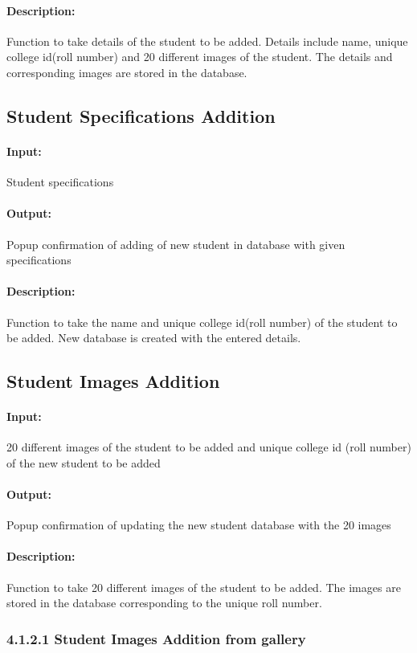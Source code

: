 \paragraph{Description:}
Function to take details of the student to be added. Details include name, 
unique college id(roll number) and 20 different images of the student. The
details and corresponding images are stored in the database.


\subsection{Student Specifications Addition}
\paragraph{Input:}
Student specifications
\paragraph{Output:}
Popup confirmation of adding of new student in database with given specifications
\paragraph{Description:}
Function to take the name and unique college id(roll number) of the student
to be added. New database is created with the entered details.

\subsection{Student Images Addition}
\paragraph{Input:}
20 different images of the student to be added and unique college id
(roll number) of the new student to be added
\paragraph{Output:}
Popup confirmation of updating the new student database with the 20 images
\paragraph{Description:}
Function to take 20 different images of the student to be added. The images are
stored in the database corresponding to the unique roll number.


\subsubsection{4.1.2.1 Student Images Addition from gallery}
